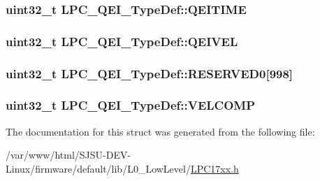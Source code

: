 \subsubsection[{\texorpdfstring{Q\+E\+I\+T\+I\+ME}{QEITIME}}]{ uint32\+\_\+t L\+P\+C\+\_\+\+Q\+E\+I\+\_\+\+Type\+Def\+::\+Q\+E\+I\+T\+I\+ME}\hypertarget{structLPC__QEI__TypeDef_a1d12b48e42270dcdedf04c6fd170300f}{}\label{structLPC__QEI__TypeDef_a1d12b48e42270dcdedf04c6fd170300f}
\subsubsection[{\texorpdfstring{Q\+E\+I\+V\+EL}{QEIVEL}}]{ uint32\+\_\+t L\+P\+C\+\_\+\+Q\+E\+I\+\_\+\+Type\+Def\+::\+Q\+E\+I\+V\+EL}\hypertarget{structLPC__QEI__TypeDef_a71f4ca0bceb1f24423af786f62e452bd}{}\label{structLPC__QEI__TypeDef_a71f4ca0bceb1f24423af786f62e452bd}
\subsubsection[{\texorpdfstring{R\+E\+S\+E\+R\+V\+E\+D0}{RESERVED0}}]{\setlength{\rightskip}{0pt plus 5cm}uint32\+\_\+t L\+P\+C\+\_\+\+Q\+E\+I\+\_\+\+Type\+Def\+::\+R\+E\+S\+E\+R\+V\+E\+D0\mbox{[}998\mbox{]}}\hypertarget{structLPC__QEI__TypeDef_a6fc6639d5d24342ffa303429b1e0bce6}{}\label{structLPC__QEI__TypeDef_a6fc6639d5d24342ffa303429b1e0bce6}
\subsubsection[{\texorpdfstring{V\+E\+L\+C\+O\+MP}{VELCOMP}}]{ uint32\+\_\+t L\+P\+C\+\_\+\+Q\+E\+I\+\_\+\+Type\+Def\+::\+V\+E\+L\+C\+O\+MP}\hypertarget{structLPC__QEI__TypeDef_ab729b9204d31a6da76b8152a9cf29408}{}\label{structLPC__QEI__TypeDef_ab729b9204d31a6da76b8152a9cf29408}


The documentation for this struct was generated from the following file\+:\begin{DoxyCompactItemize}
\item 
/var/www/html/\+S\+J\+S\+U-\/\+D\+E\+V-\/\+Linux/firmware/default/lib/\+L0\+\_\+\+Low\+Level/\hyperlink{LPC17xx_8h}{L\+P\+C17xx.\+h}\end{DoxyCompactItemize}
